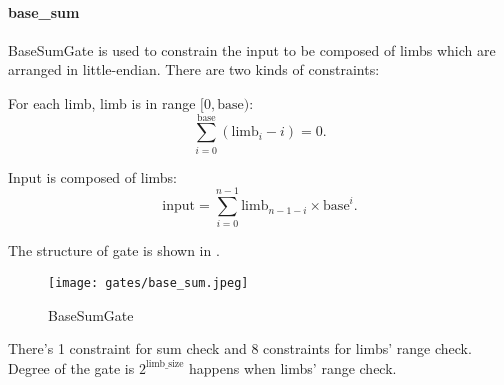 \paragraph{base\_sum}

BaseSumGate is used to constrain the input to be composed of limbs which are arranged in little-endian. There are two kinds of constraints:

For each limb, limb is in range $[0, \text{base})$:
\[ \sum_{i=0}^{\text{base}}(\text{limb}_i - i) = 0. \]

Input is composed of limbs:
\[ \text{input} = \sum_{i=0}^{n-1} \text{limb}_{n-1-i} \times \text{base}^i. \]

The structure of gate is shown in .
\begin{figure}[!ht]
    \centering
    \texttt{[image: gates/base\_sum.jpeg]}
    \caption{BaseSumGate}
    \label{fig:base-sum}
\end{figure}

There's 1 constraint for sum check and 8 constraints for limbs' range check. Degree of the gate is $2^{\text{limb\_size}}$ happens when limbs' range check.
